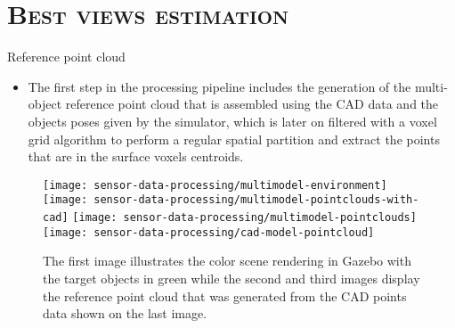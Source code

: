 \section{\scshape Best views estimation}

\begin{frame}{Reference point cloud}
	\begin{itemize}
		\item The first step in the processing pipeline includes the generation of the multi-object reference point cloud that is assembled using the CAD data and the objects poses given by the simulator, which is later on filtered with a voxel grid algorithm to perform a regular spatial partition and extract the points that are in the surface voxels centroids.
	\end{itemize}
	\begin{figure}
		\centering
		\texttt{[image: sensor-data-processing/multimodel-environment]}
		\texttt{[image: sensor-data-processing/multimodel-pointclouds-with-cad]}
		\texttt{[image: sensor-data-processing/multimodel-pointclouds]}
		\texttt{[image: sensor-data-processing/cad-model-pointcloud]}
		\caption{The first image illustrates the color scene rendering in Gazebo with the target objects in green while the second and third images display the reference point cloud that was generated from the CAD points data shown on the last image.}
	\end{figure}
\end{frame}


